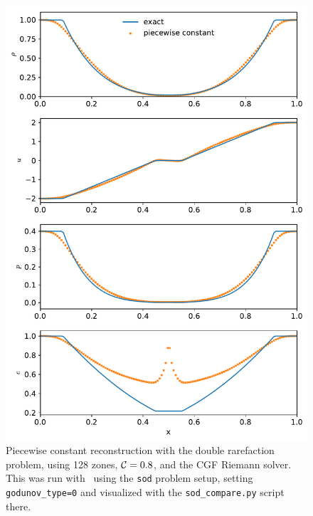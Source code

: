 \begin{figure}[t]
\centering
\includegraphics[width=0.7\linewidth]{hydro1d_god_double_rare}
\caption[Piecewise constant reconstruction double rarefaction problem]{\label{fig:Euler:doublerare:god} Piecewise constant
  reconstruction with the double rarefaction problem, using 128 zones,
  ${\mathcal{C}} = 0.8$, and the CGF Riemann solver.  This was run with
  \hydrooned\ using the {\tt sod} problem setup, setting {\tt
    godunov\_type=0} and visualized with the {\tt sod\_compare.py}
  script there.}
\end{figure}

